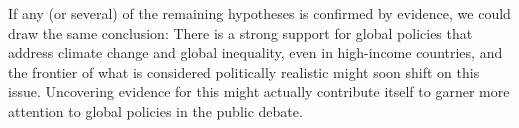 
If any (or several) of the remaining hypotheses is confirmed by evidence, we could draw the same conclusion: %
There is a strong support for global policies that address climate change and global inequality, even in high-income countries, and the frontier of what is considered politically realistic might soon shift on this issue. Uncovering evidence for this might actually contribute itself to garner more attention to global policies in the public debate. %

